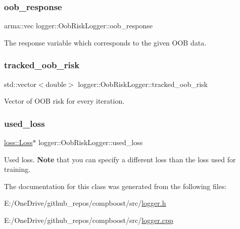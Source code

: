 \subsubsection{\texorpdfstring{oob\+\_\+response}{oob\_response}}
{\footnotesize\ttfamily arma\+::vec logger\+::\+Oob\+Risk\+Logger\+::oob\+\_\+response\hspace{0.3cm}{\ttfamily [private]}}



The response variable which corresponds to the given O\+OB data. 

\mbox{\label{classlogger_1_1_oob_risk_logger_a00a9435107588888c891c88aead67159}} 
\subsubsection{\texorpdfstring{tracked\+\_\+oob\+\_\+risk}{tracked\_oob\_risk}}
{\footnotesize\ttfamily std\+::vector$<$double$>$ logger\+::\+Oob\+Risk\+Logger\+::tracked\+\_\+oob\+\_\+risk\hspace{0.3cm}{\ttfamily [private]}}



Vector of O\+OB risk for every iteration. 

\mbox{\label{classlogger_1_1_oob_risk_logger_a40d02b9eec15e823bb2d71cf2112d6ed}} 
\subsubsection{\texorpdfstring{used\+\_\+loss}{used\_loss}}
{\footnotesize\ttfamily \mbox{\hyperlink{classloss_1_1_loss}{loss\+::\+Loss}}$\ast$ logger\+::\+Oob\+Risk\+Logger\+::used\+\_\+loss\hspace{0.3cm}{\ttfamily [private]}}



Used loss. {\bfseries Note} that you can specify a different loss than the loss used for training. 



The documentation for this class was generated from the following files\+:\begin{DoxyCompactItemize}
\item 
E\+:/\+One\+Drive/github\+\_\+repos/compboost/src/\mbox{\hyperlink{logger_8h}{logger.\+h}}\item 
E\+:/\+One\+Drive/github\+\_\+repos/compboost/src/\mbox{\hyperlink{logger_8cpp}{logger.\+cpp}}\end{DoxyCompactItemize}
